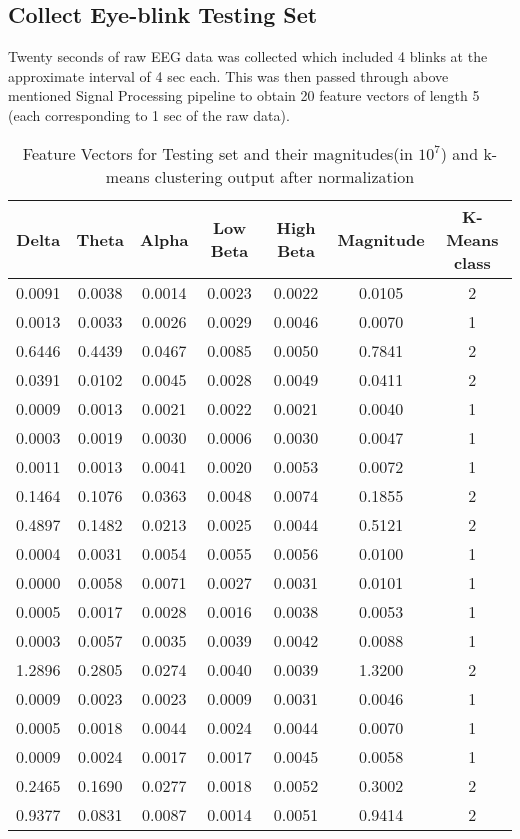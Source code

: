 \documentclass[11pt]{amsart}
\begin{document}
\subsection{Collect Eye-blink Testing Set}
Twenty seconds of raw EEG data was collected which included 4 blinks at the approximate interval of 4 sec each. This was then passed through above mentioned Signal Processing pipeline to obtain 20 feature vectors of length 5 (each corresponding to 1 sec of the raw data).
\begin{table}[]
\centering
\caption{Feature Vectors for Testing set and their magnitudes(in $10^7$) and k-means clustering output after normalization}
\label{Testing-set}
\begin{tabular}{ccccccc}
\hline
    Delta	 &Theta &Alpha &Low Beta &High Beta &Magnitude &K-Means class\\ \hline
    0.0091    &0.0038    &0.0014    &0.0023    &0.0022   &0.0105   &2\\
    0.0013    &0.0033    &0.0026    &0.0029    &0.0046   &0.0070   &1\\
    0.6446    &0.4439    &0.0467    &0.0085    &0.0050   &0.7841   &2\\
    0.0391    &0.0102    &0.0045    &0.0028    &0.0049   &0.0411   &2\\
    0.0009    &0.0013    &0.0021    &0.0022    &0.0021   &0.0040   &1\\
    0.0003    &0.0019    &0.0030    &0.0006    &0.0030   &0.0047   &1\\
    0.0011    &0.0013    &0.0041    &0.0020    &0.0053   &0.0072   &1\\
    0.1464    &0.1076    &0.0363    &0.0048    &0.0074   &0.1855   &2\\
    0.4897    &0.1482    &0.0213    &0.0025    &0.0044   &0.5121   &2\\
    0.0004    &0.0031    &0.0054    &0.0055    &0.0056   &0.0100   &1\\
    0.0000    &0.0058    &0.0071    &0.0027    &0.0031   &0.0101   &1\\
    0.0005    &0.0017    &0.0028    &0.0016    &0.0038   &0.0053   &1\\
    0.0003    &0.0057    &0.0035    &0.0039    &0.0042   &0.0088   &1\\
    1.2896    &0.2805    &0.0274    &0.0040    &0.0039   &1.3200   &2\\
    0.0009    &0.0023    &0.0023    &0.0009    &0.0031   &0.0046   &1\\
    0.0005    &0.0018    &0.0044    &0.0024    &0.0044   &0.0070   &1\\
    0.0009    &0.0024    &0.0017    &0.0017    &0.0045   &0.0058   &1\\
    0.2465    &0.1690    &0.0277    &0.0018    &0.0052   &0.3002   &2\\
    0.9377    &0.0831    &0.0087    &0.0014    &0.0051   &0.9414   &2
\end{tabular}
\end{table}
 
\end{document}
